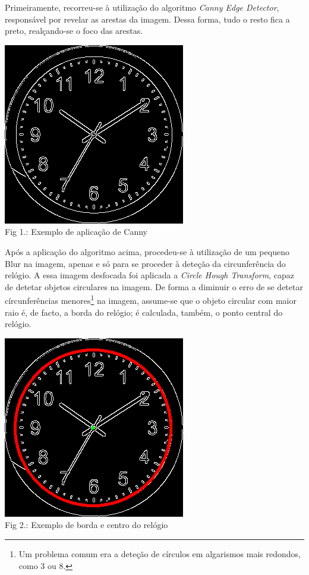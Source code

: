 \documentclass[a4paper]{article}
\begin{document}
Primeiramente, recorreu-se à utilização do algoritmo \textit{Canny Edge Detector}, responsável por revelar as arestas da imagem. Dessa forma, tudo o resto fica a preto, realçando-se o foco das arestas.

\begin{center}
    \includegraphics[scale=0.5]{canny.png}
    \\ Fig 1.: Exemplo de aplicação de Canny
\end{center}

Após a aplicação do algoritmo acima, procedeu-se à utilização de um pequeno Blur na imagem, apenas e só para se proceder à deteção da circunferência do relógio. A essa imagem desfocada foi aplicada a \textit{Circle Hough Transform}, capaz de detetar objetos circulares na imagem. De forma a diminuir o erro de se detetar círcunferências menores\footnote{Um problema comum era a deteção de círculos em algarismos mais redondos, como 3 ou 8.} na imagem, assume-se que o objeto circular com maior raio é, de facto, a borda do relógio; é calculada, também, o ponto central do relógio.

\begin{center}
    \includegraphics[scale=0.5]{outer_center.png}
    \\ Fig 2.: Exemplo de borda e centro do relógio
\end{center}
\end{document}
